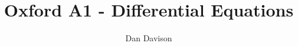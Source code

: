 \documentclass[12pt]{article}
\begin{document}
\title{Oxford A1 - Differential Equations }
\author{Dan Davison}
\maketitle

\end{document}
